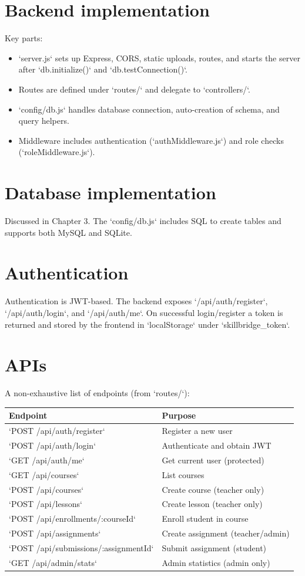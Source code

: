 \documentclass[12pt,a4paper]{report}
\begin{document}
\section{Backend implementation}
Key parts:
\begin{itemize}
  \item `server.js` sets up Express, CORS, static uploads, routes, and starts the server after `db.initialize()` and `db.testConnection()`.
  \item Routes are defined under `routes/` and delegate to `controllers/`.
  \item `config/db.js` handles database connection, auto-creation of schema, and query helpers.
  \item Middleware includes authentication (`authMiddleware.js`) and role checks (`roleMiddleware.js`).
\end{itemize}

\section{Database implementation}
Discussed in Chapter 3. The `config/db.js` includes SQL to create tables and supports both MySQL and SQLite.

\section{Authentication}
Authentication is JWT-based. The backend exposes `/api/auth/register`, `/api/auth/login`, and `/api/auth/me`. On successful login/register a token is returned and stored by the frontend in `localStorage` under `skillbridge_token`.

\section{APIs}
A non-exhaustive list of endpoints (from `routes/`):
\begin{longtable}{p{6cm}p{9cm}}
\toprule
Endpoint & Purpose \\
\midrule
`POST /api/auth/register` & Register a new user \\
`POST /api/auth/login` & Authenticate and obtain JWT \\
`GET /api/auth/me` & Get current user (protected) \\
`GET /api/courses` & List courses \\
`POST /api/courses` & Create course (teacher only) \\
`POST /api/lessons` & Create lesson (teacher only) \\
`POST /api/enrollments/:courseId` & Enroll student in course \\
`POST /api/assignments` & Create assignment (teacher/admin) \\
`POST /api/submissions/:assignmentId` & Submit assignment (student) \\
`GET /api/admin/stats` & Admin statistics (admin only) \\
\bottomrule
\end{longtable}
\end{document}

